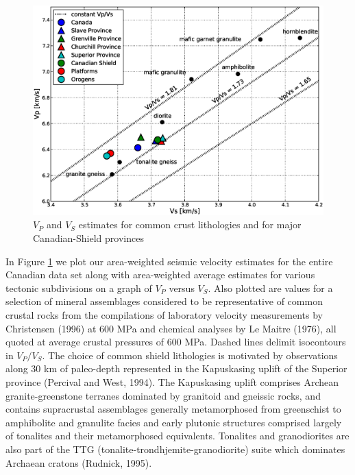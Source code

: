 \documentclass[review]{elsarticle}
\begin{document}
\begin{figure}
  \centering
  \includegraphics[width=\textwidth]{lithology.eps}
  \caption{$V_P$ and $V_S$ estimates for common crust lithologies and for major Canadian-Shield provinces}
  \label{fig:lith}
\end{figure}

In Figure \ref{fig:lith} we plot our area-weighted seismic velocity estimates for the entire Canadian data set along with area-weighted average estimates for various tectonic subdivisions on a graph of $V_P$ versus $V_S$. Also plotted are values for a selection of mineral assemblages considered to be representative of common crustal rocks from the compilations of laboratory velocity measurements by Christensen (1996) at 600 MPa and chemical analyses by Le Maitre (1976), all quoted at average crustal pressures of 600 MPa. Dashed lines delimit isocontours in $V_P/V_S$. The choice of common shield lithologies is motivated by observations along 30 km of paleo-depth represented in the Kapuskasing uplift of the Superior province (Percival and West, 1994). The Kapuskasing uplift comprises Archean granite-greenstone terranes dominated by granitoid and gneissic rocks, and contains supracrustal assemblages generally metamorphosed from greenschist to amphibolite and granulite facies and early plutonic structures comprised largely of tonalites and their metamorphosed equivalents. Tonalites and granodiorites are also part of the TTG (tonalite-trondhjemite-granodiorite) suite which dominates Archaean cratons (Rudnick, 1995).
\end{document}
